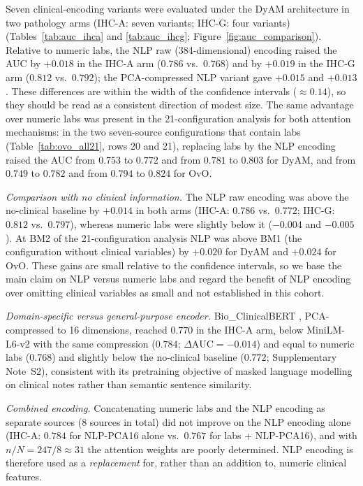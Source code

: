 Seven clinical-encoding variants were evaluated under the DyAM architecture in two pathology
arms (IHC-A: seven variants; IHC-G: four variants)
(Tables~\ref{tab:auc_ihca} and \ref{tab:auc_ihcg}; Figure~\ref{fig:auc_comparison}).
Relative to numeric labs, the NLP raw (384-dimensional) encoding raised the AUC by
$+0.018$ in the IHC-A arm ($0.786$ vs.\ $0.768$) and by $+0.019$ in the IHC-G arm
($0.812$ vs.\ $0.792$); the PCA-compressed NLP variant gave $+0.015$ and $+0.013$.
These differences are within the width of the confidence intervals ($\approx 0.14$), so they should be
read as a consistent direction of modest size.
The same advantage over numeric labs was present in the 21-configuration analysis for both
attention mechanisms: in the two seven-source configurations that contain labs
(Table~\ref{tab:ovo_all21}, rows 20 and 21), replacing labs by the NLP encoding raised the
AUC from $0.753$ to $0.772$ and from $0.781$ to $0.803$ for DyAM, and from $0.749$ to
$0.782$ and from $0.794$ to $0.824$ for OvO.

\emph{Comparison with no clinical information.}
The NLP raw encoding was above the no-clinical baseline by $+0.014$ in both arms
(IHC-A: $0.786$ vs.\ $0.772$; IHC-G: $0.812$ vs.\ $0.797$), whereas numeric labs were slightly below it
($-0.004$ and $-0.005$).
At BM2 of the 21-configuration analysis NLP was above BM1 (the configuration without clinical
variables) by $+0.020$ for DyAM and $+0.024$ for OvO.
These gains are small relative to the confidence intervals, so we base the main claim on NLP versus
numeric labs and regard the benefit of NLP encoding over omitting clinical variables as small and not
established in this cohort.

\emph{Domain-specific versus general-purpose encoder.}
Bio\_ClinicalBERT \cite{Alsentzer2019}, PCA-compressed to 16 dimensions,
reached $0.770$ in the IHC-A arm, below MiniLM-L6-v2 with the same compression
($0.784$; $\Delta\text{AUC} = -0.014$) and equal to numeric labs ($0.768$) and slightly
below the no-clinical baseline ($0.772$; Supplementary Note~S2),
consistent with its pretraining objective of masked language modelling
on clinical notes rather than semantic sentence similarity.

\emph{Combined encoding.}
Concatenating numeric labs and the NLP encoding as separate sources
(8 sources in total) did not improve on the NLP encoding alone
(IHC-A: $0.784$ for NLP-PCA16 alone vs.\ $0.767$ for labs + NLP-PCA16),
and with $n/N = 247/8 \approx 31$ the attention weights are poorly determined.
NLP encoding is therefore used as a \emph{replacement} for,
rather than an addition to, numeric clinical features.

